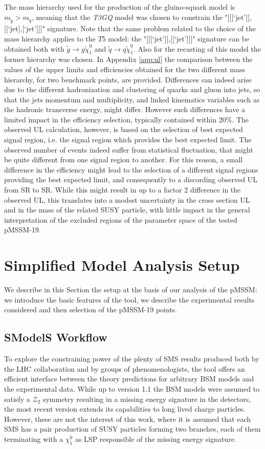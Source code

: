\documentclass[epj,nopacs,fleqn]{svjour}
\begin{document}
The mass hierarchy used for the production of the gluino-squark model is $m_{\tilde g} > m_{\tilde q}$, meaning that the \textit{T3GQ} model was chosen to constrain the "[[[`jet']],[[`jet],[`jet']]]" signature. Note that the same problem related to the choice of the mass hierarchy applies to the $T5$ model: the "[[[`jet']],[[`jet']]]" signature can be obtained both with $\tilde g \rightarrow g \tilde \chi _1 ^0$ and $\tilde q \rightarrow q \tilde \chi _1 ^0$. Also for the recasting of this model the former hierarchy was chosen. In Appendix \ref{app:ul} the comparison between the values of the upper limits and efficiencies obtained for the two different mass hierarchy, for two benchmark points, are provided. Differences can indeed arise due to the different hadronization and clustering of quarks and gluon into jets, so that the jets momentum and multiplicity, and linked kinematics variables such as the hadronic transverse energy, might differ. However such differences have a limited impact in the efficiency selection, typically contained within 20$\%$. The observed UL calculation, however, is based on the selection of best expected signal region, i.e. the signal region which provides the best expected limit. The observed number of events indeed suffer from statistical fluctuation, that might be quite different from one signal region to another. For this reason, a small difference in the efficiency might lead to the selection of a different signal regions providing the best expected limit, and consequently to a discording observed UL from SR to SR. While this might result in up to a factor 2 difference in the observed UL, this translates into a modest uncertainty in the cross section UL and in the mass of the related SUSY particle, with little impact in the general interpretation of the excluded regions of the parameter space of the tested pMSSM-19. 
%
\section{Simplified Model Analysis Setup}\label{sec::setup}
We describe in this Section the setup at the basis of our analysis of the pMSSM: we introduce the basic features of the \SMO tool, we describe the experimental results considered and then selection of the pMSSM-19 points. 
\subsection{SModelS Workflow}
To explore the constraining power of the plenty of SMS results produced both by the LHC collaboration and by groups of phenomenologists, the tool \SMO \cite{Kraml:2013mwa,Ambrogi:2017neo,Ambrogi:2018ujg} offers an efficient interface between the theory predictions for arbitrary BSM models and the experimental data. While up to version 1.1 the BSM models were assumed to satisfy a $\mathcal{Z_2}$ symmetry resulting in a missing energy signature in the detectors, the most recent version extends its capabilities to long lived charge particles. However, these are not the interest of this work, where it is assumed that each SMS has a pair production of SUSY particles forming two branches, each of them terminating with a $\chi_1 ^0$ as LSP responsible of the missing energy signature.
%
\end{document}
